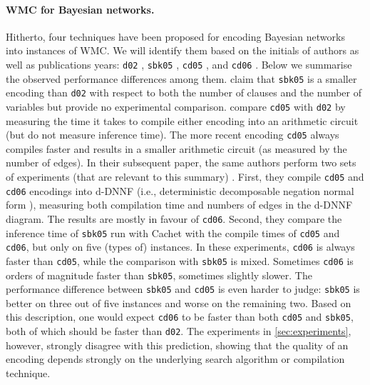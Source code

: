 \documentclass[letterpaper]{article} %
\theoremstyle{definition}
\theoremstyle{remark}
\begin{document}
\paragraph{WMC for Bayesian networks.} Hitherto, four techniques have been
proposed for encoding Bayesian networks into instances of WMC. We will identify
them based on the initials of authors as well as publications years:
\texttt{d02} \cite{DBLP:conf/kr/Darwiche02}, \texttt{sbk05}
\cite{DBLP:conf/aaai/SangBK05}, \texttt{cd05} \cite{DBLP:conf/ijcai/ChaviraD05},
and \texttt{cd06} \cite{DBLP:conf/sat/ChaviraD06}. Below we summarise the
observed performance differences among them. \citet{DBLP:conf/aaai/SangBK05}
claim that \texttt{sbk05} is a smaller encoding than \texttt{d02} with respect
to both the number of clauses and the number of variables but provide no
experimental comparison. \citet{DBLP:conf/ijcai/ChaviraD05} compare
\texttt{cd05} with \texttt{d02} by measuring the time it takes to compile either
encoding into an arithmetic circuit (but do not measure inference time). The
more recent encoding \texttt{cd05} always compiles faster and results in a
smaller arithmetic circuit (as measured by the number of edges). In their
subsequent paper, the same authors perform two sets of experiments (that are
relevant to this summary) \cite{DBLP:conf/sat/ChaviraD06}. First, they compile
\texttt{cd05} and \texttt{cd06} encodings into d-DNNF (i.e., deterministic
decomposable negation normal form \cite{DBLP:journals/jancl/Darwiche01}),
measuring both compilation time and numbers of edges in the d-DNNF diagram. The
results are mostly in favour of \texttt{cd06}. Second, they compare the
inference time of \texttt{sbk05} run with Cachet \cite{DBLP:conf/sat/SangBBKP04}
with the compile times of \texttt{cd05} and \texttt{cd06}, but only on five
(types of) instances. In these experiments, \texttt{cd06} is always faster than
\texttt{cd05}, while the comparison with \texttt{sbk05} is mixed. Sometimes
\texttt{cd06} is orders of magnitude faster than \texttt{sbk05}, sometimes
slightly slower. The performance difference between \texttt{sbk05} and
\texttt{cd05} is even harder to judge: \texttt{sbk05} is better on three out of
five instances and worse on the remaining two. Based on this description, one
would expect \texttt{cd06} to be faster than both \texttt{cd05} and
\texttt{sbk05}, both of which should be faster than \texttt{d02}. The
experiments in \cref{sec:experiments}, however, strongly disagree with this
prediction, showing that the quality of an encoding depends strongly on the
underlying search algorithm or compilation technique.
\end{document}
